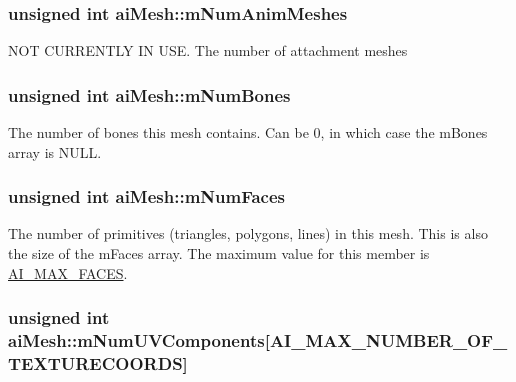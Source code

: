 \hypertarget{structai_mesh_a1692a300222b32348ae51779df4a697e}{
\subsubsection[{m\-Num\-Anim\-Meshes}]{\setlength{\rightskip}{0pt plus 5cm}unsigned {\bf int} ai\-Mesh\-::m\-Num\-Anim\-Meshes}}\label{structai_mesh_a1692a300222b32348ae51779df4a697e}
N\-O\-T C\-U\-R\-R\-E\-N\-T\-L\-Y I\-N U\-S\-E. The number of attachment meshes \hypertarget{structai_mesh_a0f9d5425b6300e32a842a94f943fd79e}{
\subsubsection[{m\-Num\-Bones}]{\setlength{\rightskip}{0pt plus 5cm}unsigned {\bf int} ai\-Mesh\-::m\-Num\-Bones}}\label{structai_mesh_a0f9d5425b6300e32a842a94f943fd79e}
The number of bones this mesh contains. Can be 0, in which case the m\-Bones array is N\-U\-L\-L. \hypertarget{structai_mesh_aeed22ee6963b79548f3877b3c905518e}{
\subsubsection[{m\-Num\-Faces}]{\setlength{\rightskip}{0pt plus 5cm}unsigned {\bf int} ai\-Mesh\-::m\-Num\-Faces}}\label{structai_mesh_aeed22ee6963b79548f3877b3c905518e}
The number of primitives (triangles, polygons, lines) in this mesh. This is also the size of the m\-Faces array. The maximum value for this member is \hyperlink{mesh_8h_aef69217e80411f3fee5aae3dc06b68ba}{A\-I\-\_\-\-M\-A\-X\-\_\-\-F\-A\-C\-E\-S}. \hypertarget{structai_mesh_a635c631a6e66d32989d6b25b2a892d86}{
\subsubsection[{m\-Num\-U\-V\-Components}]{\setlength{\rightskip}{0pt plus 5cm}unsigned {\bf int} ai\-Mesh\-::m\-Num\-U\-V\-Components\mbox{[}{\bf A\-I\-\_\-\-M\-A\-X\-\_\-\-N\-U\-M\-B\-E\-R\-\_\-\-O\-F\-\_\-\-T\-E\-X\-T\-U\-R\-E\-C\-O\-O\-R\-D\-S}\mbox{]}}}\label{structai_mesh_a635c631a6e66d32989d6b25b2a892d86}
